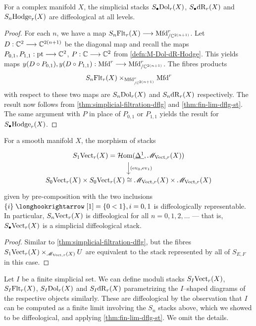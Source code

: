 \documentclass[11pt]{amsart}
\begin{document}
\begin{cor}\label{cor:simplicial-Dol-dR-Hodge-dflg}
For a complex manifold $X$, the simplicial stacks
$S_\bullet\mathrm{Dol}_r(X)$, $S_\bullet\mathrm{dR}_r(X)$ and $S_n\mathrm{Hodge}_r(X)$
are diffeological at all levels.
\end{cor}
\begin{proof}
For each $n$, we have a map $S_n\Flt_r(X) \to \Mfd^r_{/\bC^{2(n + 1)}}$.
Let $D : \bC^2 \to \bC^{2(n + 1)}$ be the diagonal map and recall the maps
$P_{0, 1}, P_{1, 1} : \pt \to \bC^2$, $P : \bC \to \bC^2$ from \cref{defn:M-Dol-dR-Hodge}.
This yields maps $y(D \circ P_{0, 1}), y(D \circ P_{1, 1}) : \Mfd^r \to \Mfd^r_{/\bC^{2(n + 1)}}$.
The fibres products
\[
S_n\mathrm{Flt}_r(X) \times_{\mathrm{Mfd}^r_{/\mathbb{C}^{2(n + 1)}}} \mathrm{Mfd}^r
\]
with respect to these two maps are $S_n\mathrm{Dol}_r(X)$ and $S_n\mathrm{dR}_r(X)$ respectively.
The result now follows from \cref{thm:simplicial-filtration-dflg} and \cref{thm:fin-lim-dflg-st}.
The same argument with $P$ in place of $P_{0, 1}$ or $P_{1, 1}$ yields the result for
$S_\bullet\mathrm{Hodge}_r(X)$.
\end{proof}

\begin{thm}\label{thm:simplicial-Vect-dflg}
For a smooth manifold $X$, the morphism of stacks
\[\begin{tikzcd}
S_1\Vect_r(X) = \HHom(\ul{\Delta^1}, \sM_{\Vect, r}(X)) \ar[d, "{(\ev_0, \ev_1)}"] \\
S_0\Vect_r(X) \times S_0\Vect_r(X) \cong \sM_{\Vect, r}(X) \times \sM_{\Vect, r}(X)
\end{tikzcd}\]
given by pre-composition with the two inclusions
$\set{i} \hto \sbr{1} = \set{0 < 1}, i = 0 , 1$ is diffeologically representable.
In particular, $S_n\mathrm{Vect}_r(X)$ is diffeological for all $n = 0, 1, 2, \dots$ --- that is,
$S_\bullet\mathrm{Vect}_r(X)$ is a simplicial diffeological stack.
\end{thm}
\begin{proof}
Similar to \cref{thm:simplicial-filtration-dflg}, but the fibres
$S_1\mathrm{Vect}_r(X) \times_{\mathscr{M}_{\mathrm{Vect}, r}(X)} U$ are equivalent to the stack represented by all of
$S_{E, F}$ in this case.
\end{proof}

\begin{rmk}
Let $I$ be a finite simplicial set. We can define moduli stacks
$S_I\mathrm{Vect}_r(X)$, $S_I\mathrm{Flt}_r(X)$, $S_I\mathrm{Dol}_r(X)$ and $S_I\mathrm{dR}_r(X)$ parametrizing the
$I$--shaped diagrams of the respective objects similarly. These are diffeological
by the observation that $I$ can be computed as a finite limit involving the $S_n$ stacks
above, which we showed to be diffeological, and applying \cref{thm:fin-lim-dflg-st}.
We omit the details.
\end{rmk}
\end{document}
